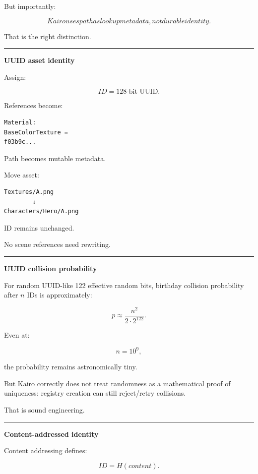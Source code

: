 But importantly:

\[
\boxed{
Kairo uses path as lookup metadata,
not durable identity.
}
\]

That is the right distinction.

\begin{center}\rule{0.5\linewidth}{0.5pt}\end{center}

\textbf{UUID asset identity}

Assign:

\[
ID=
128\text{-bit UUID}.
\]

References become:

\begin{verbatim}
Material:
BaseColorTexture =
f03b9c...
\end{verbatim}

Path becomes mutable metadata.

Move asset:

\begin{verbatim}
Textures/A.png
        ↓
Characters/Hero/A.png
\end{verbatim}

ID remains unchanged.

No scene references need rewriting.

\begin{center}\rule{0.5\linewidth}{0.5pt}\end{center}

\textbf{UUID collision probability}

For random UUID-like 122 effective random bits, birthday collision probability after \(n\) IDs is approximately:

\[
p\approx
\frac{n^2}{2\cdot2^{122}}.
\]

Even at:

\[
n=10^9,
\]

the probability remains astronomically tiny.

But Kairo correctly does not treat randomness as a mathematical proof of uniqueness: registry creation can still reject/retry collisions.

That is sound engineering.

\begin{center}\rule{0.5\linewidth}{0.5pt}\end{center}

\textbf{Content-addressed identity}

Content addressing defines:

\[
ID=H(content).
\]

